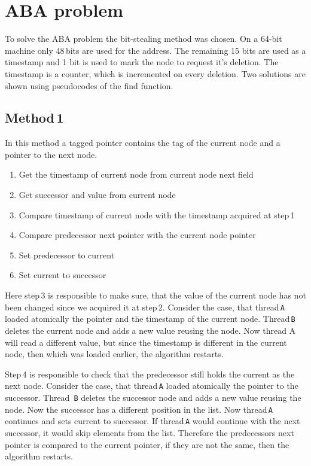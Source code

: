 \documentclass{article}
\begin{document}
\section{ABA problem}

To solve the ABA problem the bit-stealing method was chosen.
On a 64-bit machine only 48\,bits are used for the address.
The remaining 15 bits are used as a timestamp and 1 bit is used to mark the node to request it's deletion.
The timestamp is a counter, which is incremented on every deletion. Two solutions are shown using pseudocodes of the find function.

\subsection{Method\,1}

In this method a tagged pointer contains the tag of the current node and a pointer to the next node.

\begin{enumerate}
\item Get the timestamp of current node from current node next field
\item Get successor and value from current node
\item Compare timestamp of current node with the timestamp acquired at step\,1
\item Compare predecessor next pointer with the current node pointer
\item Set predecessor to current
\item Set current to successor
\end{enumerate}

Here step\,3 is responsible to make sure, that the value of the current node has not been changed since we acquired it at step\,2.
Consider the case, that thread\,\texttt{A} loaded atomically the pointer and the timestamp of the current node.
Thread\,\texttt{B} deletes the current node and adds a new value reusing the node.
Now thread A will read a different value, but since the timestamp is different in the current node, then which was loaded earlier, the algorithm restarts.

Step\,4 is responsible to check that the predecessor still holds the current as the next node.
Consider the case, that thread\,\texttt{A} loaded atomically the pointer to the successor.
Thread \,\texttt{B} deletes the successor node and adds a new value reusing the node.
Now the successor has a different position in the list.
Now thread\,\texttt{A} continues and sets current to successor.
If thread\,\texttt{A} would continue with the next successor, it would skip elements from the list.
Therefore the predecessors next pointer is compared to the current pointer, if they are not the same, then the algorithm restarts.
\end{document}
